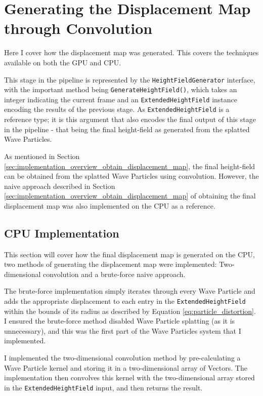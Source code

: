 \documentclass[12pt,a4paper,twoside]{report}
\begin{document}
\section{Generating the Displacement Map through Convolution}

Here I cover how the displacement map was generated. This
covers the techniques available on both the GPU and CPU.

This stage in the pipeline is represented by the \texttt{HeightFieldGenerator}
interface, with the important method being \texttt{GenerateHeightField()},
which takes an integer indicating the current frame and an
\texttt{ExtendedHeightField} instance encoding the results of the previous
stage. As \texttt{ExtendedHeightField} is a reference type; it is this argument
that also encodes the final output of this stage in the pipeline - that being
the final height-field as generated from the splatted Wave Particles.

As mentioned in Section
\ref{sec:implementation_overview_obtain_displacement_map}, the final
height-field can be obtained from the splatted Wave Particles using convolution.
However, the naive approach described in Section
\ref{sec:implementation_overview_obtain_displacement_map} of obtaining the
final displacement map was also implemented on the CPU as a reference.

\subsection{CPU Implementation}
\label{sec:implementation_convolution_cpu}

This section will cover how the final displacement map is generated on the CPU,
two methods of generating the displacement map were implemented:
Two-dimensional convolution and a brute-force naive approach.

The brute-force implementation simply iterates through every Wave Particle and
adds the appropriate displacement to each entry in the
\texttt{ExtendedHeightField} within the bounds of its radius as described by
Equation \ref{eq:particle_distortion}. I ensured the brute-force method
disabled Wave Particle splatting (as it is unnecessary), and this was the first
part of the Wave Particles system that I implemented.

I implemented the two-dimensional convolution method by pre-calculating a Wave
Particle kernel and storing it in a two-dimensional array of Vectors. The
implementation then convolves this kernel with the two-dimensional array stored
in the \texttt{ExtendedHeightField} input, and then returns the result.
\end{document}
